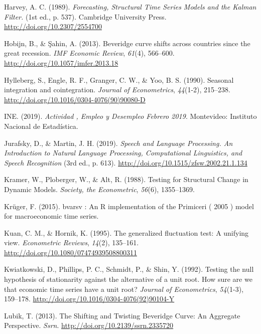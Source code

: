 \documentclass[12pt,oneside]{reedthesis}
\begin{document}
\leavevmode\hypertarget{ref-Harvey1989}{}%
Harvey, A. C. (1989). \emph{Forecasting, Structural Time Series Models and the Kalman Filter.} (1st ed., p. 537). Cambridge University Press. \url{http://doi.org/10.2307/2554700}

\leavevmode\hypertarget{ref-Hobijn2013}{}%
Hobijn, B., \& Şahin, A. (2013). Beveridge curve shifts across countries since the great recession. \emph{IMF Economic Review}, \emph{61}(4), 566--600. \url{http://doi.org/10.1057/imfer.2013.18}

\leavevmode\hypertarget{ref-hegy1990}{}%
Hylleberg, S., Engle, R. F., Granger, C. W., \& Yoo, B. S. (1990). Seasonal integration and cointegration. \emph{Journal of Econometrics}, \emph{44}(1-2), 215--238. \url{http://doi.org/10.1016/0304-4076(90)90080-D}

\leavevmode\hypertarget{ref-INE2019}{}%
INE. (2019). \emph{Actividad , Empleo y Desempleo Febrero 2019}. Montevideo: Instituto Nacional de Estadística.

\leavevmode\hypertarget{ref-Jurasky2019}{}%
Jurafsky, D., \& Martin, J. H. (2019). \emph{Speech and Language Processing. An Introduction to Natural Language Processing, Computational Linguistics, and Speech Recognition} (3rd ed., p. 613). \url{http://doi.org/10.1515/zfsw.2002.21.1.134}

\leavevmode\hypertarget{ref-Society1988}{}%
Kramer, W., Ploberger, W., \& Alt, R. (1988). Testing for Structural Change in Dynamic Models. \emph{Society, the Econometric}, \emph{56}(6), 1355--1369.

\leavevmode\hypertarget{ref-Kruger2015}{}%
Krüger, F. (2015). bvarsv : An R implementation of the Primiceri ( 2005 ) model for macroeconomic time series.

\leavevmode\hypertarget{ref-Kuan1995}{}%
Kuan, C. M., \& Hornik, K. (1995). The generalized fluctuation test: A unifying view. \emph{Econometric Reviews}, \emph{14}(2), 135--161. \url{http://doi.org/10.1080/07474939508800311}

\leavevmode\hypertarget{ref-KPSS1992}{}%
Kwiatkowski, D., Phillips, P. C., Schmidt, P., \& Shin, Y. (1992). Testing the null hypothesis of stationarity against the alternative of a unit root. How sure are we that economic time series have a unit root? \emph{Journal of Econometrics}, \emph{54}(1-3), 159--178. \url{http://doi.org/10.1016/0304-4076(92)90104-Y}

\leavevmode\hypertarget{ref-Lubik2013}{}%
Lubik, T. (2013). The Shifting and Twisting Beveridge Curve: An Aggregate Perspective. \emph{Ssrn}. \url{http://doi.org/10.2139/ssrn.2335720}
\end{document}

